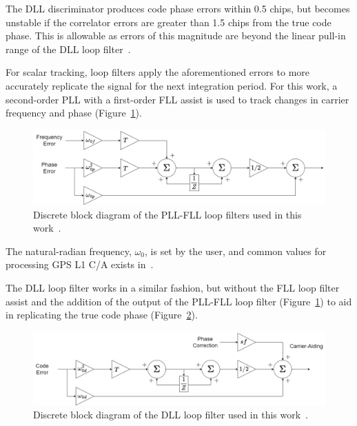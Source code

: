 The DLL discriminator produces code phase errors within 0.5 chips, but becomes unstable if the correlator errors are greater than 1.5 chips from the true code phase. This is allowable as errors of this magnitude are beyond the linear pull-in range of the DLL loop filter~\cite{kaplanUnderstandingGPSPrinciples2006}.

For scalar tracking, loop filters apply the aforementioned errors to more accurately replicate the signal for the next integration period. For this work, a second-order PLL with a first-order FLL assist is used to track changes in carrier frequency and phase (Figure~\ref{fig:PLL}).

\begin{figure}[!ht]
    \centering
    \includegraphics[width=\linewidth]{Figures/PLL.png}
    \caption{Discrete block diagram of the PLL-FLL loop filters used in this work~\cite{kaplanUnderstandingGPSPrinciples2006}.}\label{fig:PLL}
\end{figure}

The natural-radian frequency, \(\omega_0\), is set by the user, and common values for processing GPS L1 C/A exists in~\cite{kaplanUnderstandingGPSPrinciples2006}.

The DLL loop filter works in a similar fashion, but without the FLL loop filter assist and the addition of the output of the PLL-FLL loop filter (Figure~\ref{fig:PLL}) to aid in replicating the true code phase (Figure~\ref{fig:DLL}).

\begin{figure}[!ht]
    \centering
    \includegraphics[width=\linewidth]{Figures/DLL.png}
    \caption{Discrete block diagram of the DLL loop filter used in this work~\cite{kaplanUnderstandingGPSPrinciples2006}.}\label{fig:DLL}
\end{figure}


